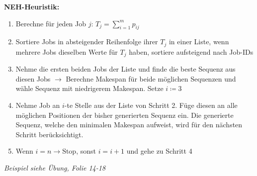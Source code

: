 \bigskip
\textbf{NEH-Heuristik:}
\begin{enumerate}
	\item Berechne für jeden Job $j$: $T_j=\sum\limits_{i=1}^{m}p_{ij}$
	\item Sortiere Jobs in absteigender Reihenfolge ihrer $T_j$ in einer Liste, wenn mehrere Jobs dieselben Werte für $T_j$ haben, sortiere aufsteigend nach Job-IDs
	\item Nehme die ersten beiden Jobs der Liste und finde die beste Sequenz aus
	diesen Jobs $\rightarrow$ Berechne Makespan für beide möglichen Sequenzen
	und wähle Sequenz mit niedrigerem Makespan. Setze $i\coloneqq 3$
	\item Nehme Job an $i$-te Stelle aus der Liste von Schritt 2. Füge diesen an alle möglichen Positionen der bisher generierten Sequenz ein. Die generierte
	Sequenz, welche den minimalen Makespan aufweist, wird für den nächsten Schritt
	berücksichtigt.
	\item Wenn $i=n \rightarrow \text{Stop}$, sonst $i=i+1$ und gehe zu Schritt 4
\end{enumerate}
\textit{Beispiel siehe Übung, Folie 14-18}
\\

